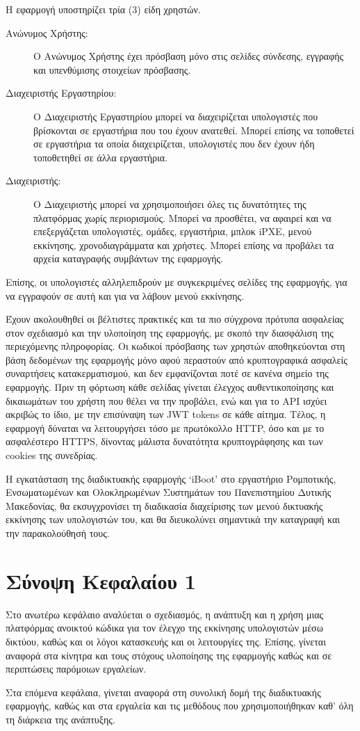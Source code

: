 Η εφαρμογή υποστηρίζει τρία (3) είδη χρηστών.
\begin{description}
	\item[Ανώνυμος Χρήστης:] Ο Ανώνυμος Χρήστης έχει πρόσβαση μόνο στις σελίδες σύνδεσης, εγγραφής και υπενθύμισης στοιχείων πρόσβασης.
	\item[Διαχειριστής Εργαστηρίου:] Ο Διαχειριστής Εργαστηρίου μπορεί να διαχειρίζεται υπολογιστές που βρίσκονται σε εργαστήρια που του έχουν ανατεθεί. Μπορεί επίσης να τοποθετεί σε εργαστήρια τα οποία διαχειρίζεται, υπολογιστές που δεν έχουν ήδη τοποθετηθεί σε άλλα εργαστήρια.
	\item[Διαχειριστής:] Ο Διαχειριστής μπορεί να χρησιμοποιήσει όλες τις δυνατότητες της πλατφόρμας χωρίς περιορισμούς. Μπορεί να προσθέτει, να αφαιρεί και να επεξεργάζεται υπολογιστές, ομάδες, εργαστήρια, μπλοκ iPXE, μενού εκκίνησης, χρονοδιαγράμματα και χρήστες. Μπορεί επίσης να προβάλει τα αρχεία καταγραφής συμβάντων της εφαρμογής.
\end{description}
Επίσης, οι υπολογιστές αλληλεπιδρούν με συγκεκριμένες σελίδες της εφαρμογής, για να εγγραφούν σε αυτή και για να λάβουν μενού εκκίνησης.

Έχουν ακολουθηθεί οι βέλτιστες πρακτικές και τα πιο σύγχρονα πρότυπα ασφαλείας στον σχεδιασμό και την υλοποίηση της εφαρμογής, με σκοπό την διασφάλιση της περιεχόμενης πληροφορίας. Οι κωδικοί πρόσβασης των χρηστών αποθηκεύονται στη βάση δεδομένων της εφαρμογής μόνο αφού περαστούν από κρυπτογραφικά ασφαλείς συναρτήσεις κατακερματισμού, και δεν εμφανίζονται ποτέ σε κανένα σημείο της εφαρμογής. Πριν τη φόρτωση κάθε σελίδας γίνεται έλεγχος αυθεντικοποίησης και δικαιωμάτων του χρήστη που θέλει να την προβάλει, ενώ και για το API ισχύει ακριβώς το ίδιο, με την επισύναψη των JWT tokens σε κάθε αίτημα. Τέλος, η εφαρμογή δύναται να λειτουργήσει τόσο με πρωτόκολλο HTTP, όσο και με το ασφαλέστερο HTTPS, δίνοντας μάλιστα δυνατότητα κρυπτογράφησης και των cookies της συνεδρίας.

Η εγκατάσταση της διαδικτυακής εφαρμογής `iBoot' στο εργαστήριο Ρομποτικής, Ενσωματωμένων και Ολοκληρωμένων Συστημάτων του Πανεπιστημίου Δυτικής Μακεδονίας, θα εκσυγχρονίσει τη διαδικασία διαχείρισης των μενού δικτυακής εκκίνησης των υπολογιστών του, και θα διευκολύνει σημαντικά την καταγραφή και την παρακολούθησή τους.

\section{Σύνοψη Κεφαλαίου 1}
Στο ανωτέρω κεφάλαιο αναλύεται ο σχεδιασμός, η ανάπτυξη και η χρήση μιας πλατφόρμας ανοικτού κώδικα για τον έλεγχο της εκκίνησης υπολογιστών μέσω δικτύου, καθώς και οι λόγοι κατασκευής και οι λειτουργίες της. Επίσης, γίνεται αναφορά στα κίνητρα και τους στόχους υλοποίησης της εφαρμογής καθώς και σε περιπτώσεις παρόμοιων εργαλείων.

Στα επόμενα κεφάλαια, γίνεται αναφορά στη συνολική δομή της διαδικτυακής εφαρμογής, καθώς και στα εργαλεία και τις μεθόδους που χρησιμοποιήθηκαν καθ' όλη τη διάρκεια της ανάπτυξης.
